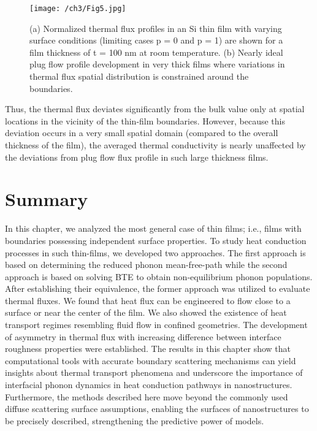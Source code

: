 \clearpage
\begin{figure}[hbt]
	\centering\texttt{[image: /ch3/Fig5.jpg]}
	\caption{(a) Normalized thermal flux profiles in an Si thin film with varying surface conditions (limiting cases \gls{p} = 0 and \gls{p} = 1) are shown for a film thickness of \gls{t} = 100 nm at room temperature. (b) Nearly ideal plug flow profile development in very thick films where variations in thermal flux spatial distribution is constrained around the boundaries.}
	\label{fig:ch3-results-flux-fluid}
\end{figure}

Thus, the thermal flux deviates significantly from the bulk value only at spatial locations in the vicinity of the thin-film boundaries. However, because this deviation occurs in a very small spatial domain (compared to the overall thickness of the film), the averaged thermal conductivity is nearly unaffected by the deviations from plug flow flux profile in such large thickness films.
\section{Summary}
In this chapter, we analyzed the most general case of thin films; i.e., films with boundaries possessing independent surface properties. To study heat conduction processes in such thin-films, we developed two approaches. The first approach is based on determining the reduced phonon mean-free-path while the second approach is based on solving BTE to obtain non-equilibrium phonon populations. After establishing their equivalence, the former approach was utilized to evaluate thermal fluxes. We found that heat flux can be engineered to flow close to a surface or near the center of the film. We also showed the existence of heat transport regimes resembling fluid flow in confined geometries. The development of asymmetry in thermal flux with increasing difference between interface roughness properties were established. The results in this chapter show that computational tools with accurate boundary scattering mechanisms can yield insights about thermal transport phenomena and underscore the importance of interfacial phonon dynamics in heat conduction pathways in nanostructures. Furthermore, the methods described here move beyond the commonly used diffuse scattering surface assumptions, enabling the surfaces of nanostructures to be precisely described, strengthening the predictive power of models.

